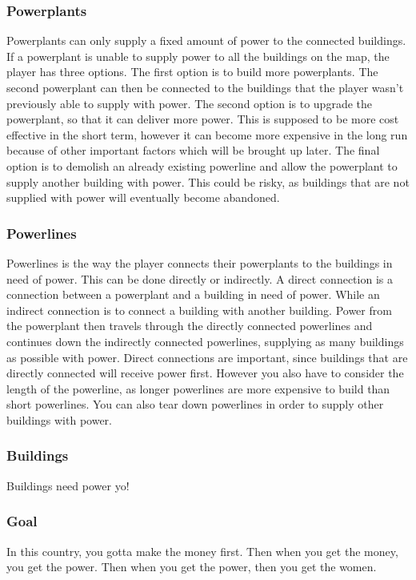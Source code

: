 \subsubsection{Powerplants}
Powerplants can only supply a fixed amount of power to the connected buildings. If a powerplant is 
unable to supply power to all the buildings on the map, the player has three options. The first option 
is to build more powerplants. The second powerplant can then be connected to the buildings that the
player wasn't previously able to supply with power. The second option is to upgrade the powerplant,
so that it can deliver more power. This is supposed to be more cost effective in the short term, however
it can become more expensive in the long run because of other important factors which will be brought
up later. The final option is to demolish an already existing powerline and allow the powerplant to
supply another building with power. This could be risky, as buildings that are not supplied with power
will eventually become abandoned.

\subsubsection{Powerlines}
Powerlines is the way the player connects their powerplants to the buildings in need of power. This 
can be done directly or indirectly. A direct connection is a connection between a powerplant and a 
building in need of power. While an indirect connection is to connect a building with another building.
Power from the powerplant then travels through the directly connected powerlines and continues down 
the indirectly connected powerlines, supplying as many buildings as possible with power. Direct 
connections are important, since buildings that are directly connected will receive power first.
However you also have to consider the length of the powerline, as longer powerlines are more expensive
to build than short powerlines. You can also tear down powerlines in order to supply other buildings
with power.

\subsubsection{Buildings}
Buildings need power yo!

\subsubsection{Goal}
In this country, you gotta make the money first. Then when you get the money, you get the power. Then
when you get the power, then you get the women.
